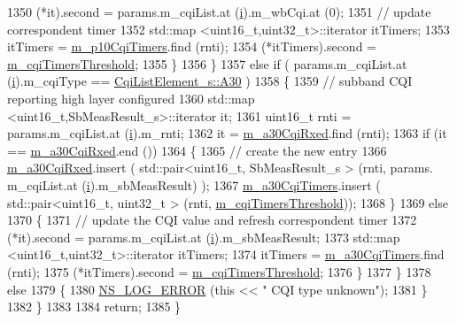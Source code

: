 \begin{DoxyCode}
1350               (*it).second = params.m\_cqiList.at (\hyperlink{bernuolliDistribution_8m_a6f6ccfcf58b31cb6412107d9d5281426}{i}).m\_wbCqi.at (0);
1351               \textcolor{comment}{// update correspondent timer}
1352               std::map <uint16\_t,uint32\_t>::iterator itTimers;
1353               itTimers = \hyperlink{classns3_1_1TtaFfMacScheduler_a8b66a6a0a7a737e132a112c945ecefa9}{m\_p10CqiTimers}.find (rnti);
1354               (*itTimers).second = \hyperlink{classns3_1_1TtaFfMacScheduler_a3dd8aa322782db3d0f2bbaf9fede6fca}{m\_cqiTimersThreshold};
1355             \}
1356         \}
1357       \textcolor{keywordflow}{else} \textcolor{keywordflow}{if} ( params.m\_cqiList.at (\hyperlink{bernuolliDistribution_8m_a6f6ccfcf58b31cb6412107d9d5281426}{i}).m\_cqiType == \hyperlink{structns3_1_1CqiListElement__s_a8f1bd827fd9842e7c07e39265d88299aab9a9d64494e36c89d7932a00edb056a7}{CqiListElement\_s::A30} )
1358         \{
1359           \textcolor{comment}{// subband CQI reporting high layer configured}
1360           std::map <uint16\_t,SbMeasResult\_s>::iterator it;
1361           uint16\_t rnti = params.m\_cqiList.at (\hyperlink{bernuolliDistribution_8m_a6f6ccfcf58b31cb6412107d9d5281426}{i}).m\_rnti;
1362           it = \hyperlink{classns3_1_1TtaFfMacScheduler_aeb3f62c230eed9a1e5488b7466c26d56}{m\_a30CqiRxed}.find (rnti);
1363           \textcolor{keywordflow}{if} (it == \hyperlink{classns3_1_1TtaFfMacScheduler_aeb3f62c230eed9a1e5488b7466c26d56}{m\_a30CqiRxed}.end ())
1364             \{
1365               \textcolor{comment}{// create the new entry}
1366               \hyperlink{classns3_1_1TtaFfMacScheduler_aeb3f62c230eed9a1e5488b7466c26d56}{m\_a30CqiRxed}.insert ( std::pair<uint16\_t, SbMeasResult\_s > (rnti, params.
      m\_cqiList.at (\hyperlink{bernuolliDistribution_8m_a6f6ccfcf58b31cb6412107d9d5281426}{i}).m\_sbMeasResult) );
1367               \hyperlink{classns3_1_1TtaFfMacScheduler_ac0ad6a5aaee1c2c92ae0d73d401b0d2c}{m\_a30CqiTimers}.insert ( std::pair<uint16\_t, uint32\_t > (rnti, 
      \hyperlink{classns3_1_1TtaFfMacScheduler_a3dd8aa322782db3d0f2bbaf9fede6fca}{m\_cqiTimersThreshold}));
1368             \}
1369           \textcolor{keywordflow}{else}
1370             \{
1371               \textcolor{comment}{// update the CQI value and refresh correspondent timer}
1372               (*it).second = params.m\_cqiList.at (\hyperlink{bernuolliDistribution_8m_a6f6ccfcf58b31cb6412107d9d5281426}{i}).m\_sbMeasResult;
1373               std::map <uint16\_t,uint32\_t>::iterator itTimers;
1374               itTimers = \hyperlink{classns3_1_1TtaFfMacScheduler_ac0ad6a5aaee1c2c92ae0d73d401b0d2c}{m\_a30CqiTimers}.find (rnti);
1375               (*itTimers).second = \hyperlink{classns3_1_1TtaFfMacScheduler_a3dd8aa322782db3d0f2bbaf9fede6fca}{m\_cqiTimersThreshold};
1376             \}
1377         \}
1378       \textcolor{keywordflow}{else}
1379         \{
1380           \hyperlink{group__logging_ga0261a8db1d4ac5f79417d117634fd455}{NS\_LOG\_ERROR} (\textcolor{keyword}{this} << \textcolor{stringliteral}{" CQI type unknown"});
1381         \}
1382     \}
1383 
1384   \textcolor{keywordflow}{return};
1385 \}
\end{DoxyCode}



